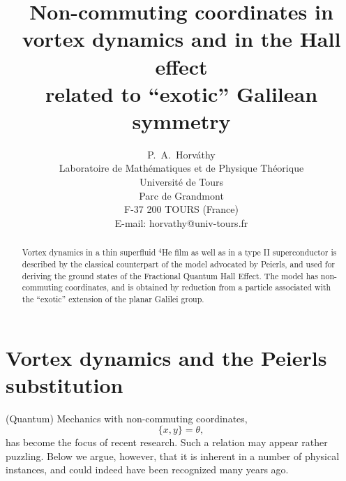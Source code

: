 \documentclass[a4paper,12pt]{article}
\begin{document}

\title{Non-commuting coordinates in
vortex dynamics and in the Hall effect\\
related to ``exotic'' Galilean symmetry}

\author{P.~A.~Horv\'athy
\\
Laboratoire de Math\'ematiques et de Physique Th\'eorique\\
Universit\'e de Tours\\
Parc de Grandmont\\
F-37 200 TOURS (France)\\ 
E-mail: horvathy@univ-tours.fr}  

\maketitle

\begin{abstract}
    Vortex dynamics in a thin superfluid ${}^4$He film
    as well as in a type II superconductor
    is described by the classical counterpart of
    the model advocated by Peierls, and used for deriving
    the ground states of the Fractional Quantum Hall Effect.
    The model has non-commuting coordinates, and is obtained
    by reduction from a particle associated with the ``exotic''
     extension of the planar Galilei group.
\end{abstract}
    
\section{Vortex dynamics and the Peierls substitution}
                                             
(Quantum) Mechanics with non-commuting coordinates\cite{NC,NC2},
\begin{equation}
\big\{x,y\big\}=\theta,
\label{xycomrel}
\end{equation}
has become the focus of recent research.
Such a relation may appear rather puzzling. Below we argue,
however, that it is inherent in a number of physical instances,
and could indeed have been recognized many years ago.
\end{document}
